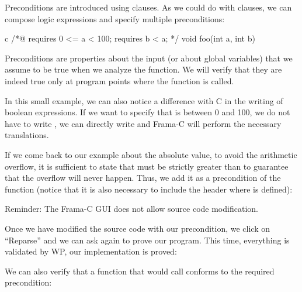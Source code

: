 


Preconditions are introduced using  clauses. As we
could do with  clauses, we can compose logic expressions
and specify multiple preconditions:



\begin{CodeBlock}{c}
/*@
  requires 0 <= a < 100;
  requires b < a;
*/
void foo(int a, int b){

}
\end{CodeBlock}



Preconditions are properties about the input (or about
global variables) that we assume to be true when we analyze the
function. We will verify that they are indeed true only at program
points where the function is called.



In this small example, we can also notice a difference with C in the
writing of boolean expressions. If we want to specify that  is
between 0 and 100, we do not have to write ,
we can directly write  and Frama-C will
perform the necessary translations.



If we come back to our example about the absolute value, to avoid the
arithmetic overflow, it is sufficient to state that  must
be strictly greater than  to guarantee that the
overflow will never happen. Thus, we add it as a precondition of the
function (notice that it is also necessary to include the header where
 is defined):






\begin{Warning}
  Reminder: The Frama-C GUI does not allow source code modification.
\end{Warning}


Once we have modified the source code with our precondition, we click on
``Reparse'' and we can ask again to prove our program. This time,
everything is validated by WP, our implementation is proved:





We can also verify that a function that would call 
conforms to the required precondition:



